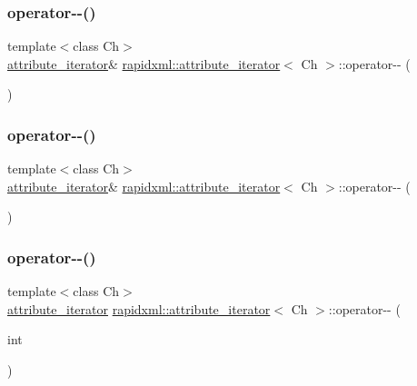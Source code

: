 \subsubsection{\texorpdfstring{operator-\/-\/()}{operator--()}\hspace{0.1cm}{\footnotesize\ttfamily [1/4]}}
{\footnotesize\ttfamily template$<$class Ch$>$ \\
\mbox{\hyperlink{classrapidxml_1_1attribute__iterator}{attribute\+\_\+iterator}}\& \mbox{\hyperlink{classrapidxml_1_1attribute__iterator}{rapidxml\+::attribute\+\_\+iterator}}$<$ Ch $>$\+::operator-\/-\/ (\begin{DoxyParamCaption}{ }\end{DoxyParamCaption})\hspace{0.3cm}{\ttfamily [inline]}}

\mbox{\label{classrapidxml_1_1attribute__iterator_af22f1ad3c11d3269b43b49e29b89d7d1}} 
\subsubsection{\texorpdfstring{operator-\/-\/()}{operator--()}\hspace{0.1cm}{\footnotesize\ttfamily [2/4]}}
{\footnotesize\ttfamily template$<$class Ch$>$ \\
\mbox{\hyperlink{classrapidxml_1_1attribute__iterator}{attribute\+\_\+iterator}}\& \mbox{\hyperlink{classrapidxml_1_1attribute__iterator}{rapidxml\+::attribute\+\_\+iterator}}$<$ Ch $>$\+::operator-\/-\/ (\begin{DoxyParamCaption}{ }\end{DoxyParamCaption})\hspace{0.3cm}{\ttfamily [inline]}}

\mbox{\label{classrapidxml_1_1attribute__iterator_af52a8562ab1b2c0391cdde79f55e4a6f}} 
\subsubsection{\texorpdfstring{operator-\/-\/()}{operator--()}\hspace{0.1cm}{\footnotesize\ttfamily [3/4]}}
{\footnotesize\ttfamily template$<$class Ch$>$ \\
\mbox{\hyperlink{classrapidxml_1_1attribute__iterator}{attribute\+\_\+iterator}} \mbox{\hyperlink{classrapidxml_1_1attribute__iterator}{rapidxml\+::attribute\+\_\+iterator}}$<$ Ch $>$\+::operator-\/-\/ (\begin{DoxyParamCaption}\item[{int}]{ }\end{DoxyParamCaption})\hspace{0.3cm}{\ttfamily [inline]}}


